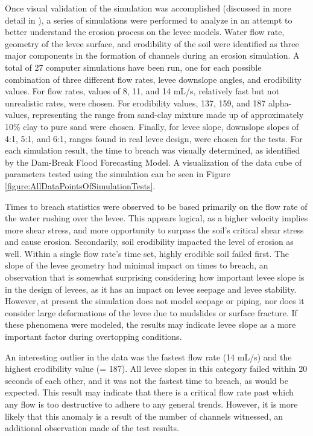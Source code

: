 Once visual validation of the simulation was accomplished (discussed in more detail in \cite{Chen:2010:QAS:1869790.1869867}), a series of simulations were performed to analyze in an attempt to better understand the erosion process on the levee models. Water flow rate, geometry of the levee surface, and erodibility of the soil were identified as three major components in the formation of channels during an erosion simulation. A total of 27 computer simulations have been run, one for each possible combination of three different flow rates, levee downslope angles, and erodibility values. For flow rates, values of 8, 11, and 14 mL/s, relatively fast but not unrealistic rates, were chosen. For erodibility values, 137, 159, and 187 alpha-values, representing the range from sand-clay mixture made up of approximately 10\% clay to pure sand were chosen. Finally, for levee slope, downslope slopes of 4:1, 5:1, and 6:1, ranges found in real levee design, were chosen for the tests. For each simulation result, the time to breach was visually determined, as identified by the Dam-Break Flood Forecasting Model. A visualization of the data cube of parameters tested using the simulation can be seen in Figure \ref{figure:AllDataPointsOfSimulationTests}.

Times to breach statistics were observed to be based primarily on the flow rate of the water rushing over the levee. This appears logical, as a higher velocity implies more shear stress, and more opportunity to surpass the soil's critical shear stress and cause erosion. Secondarily, soil erodibility impacted the level of erosion as well. Within a single flow rate's time set, highly erodible soil failed first. The slope of the levee geometry had minimal impact on times to breach, an observation that is somewhat surprising considering how important levee slope is in the design of levees, as it has an impact on levee seepage and levee stability. However, at present the simulation does not model seepage or piping, nor does it consider large deformations of the levee due to mudslides or surface fracture. If these phenomena were modeled, the results may indicate levee slope as a more important factor during overtopping conditions.

An interesting outlier in the data was the fastest flow rate (14 mL/s) and the highest erodibility value (= 187). All levee slopes in this category failed within 20 seconds of each other, and it was not the fastest time to breach, as would be expected. This result may indicate that there is a critical flow rate past which any flow is too destructive to adhere to any general trends. However, it is more likely that this anomaly is a result of the number of channels witnessed, an additional observation made of the test results.

